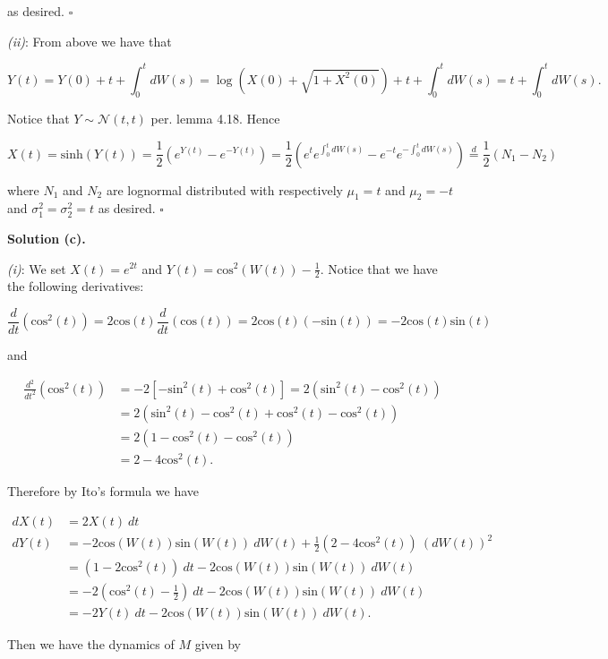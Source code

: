 \documentclass[
]{book}
\begin{document}
as desired. \(\square\)

\emph{(ii)}: From above we have that

\[
Y(t)=Y(0)+t+\int_0^tdW(s)=\log(X(0)+\sqrt{1+X^2(0)})+t+\int_0^tdW(s)=t+\int_0^t dW(s).
\]

Notice that \(Y\sim\mathcal{N}\left(t,t\right)\) per. lemma 4.18. Hence

\[
X(t)=\text{sinh}(Y(t))=\frac{1}{2}(e^{Y(t)}-e^{-Y(t)})=\frac{1}{2}(e^{t}e^{\int_0^t dW(s)}-e^{-t}e^{-\int_0^t dW(s)})\stackrel{d}{=}\frac{1}{2}(N_1-N_2)
\]

where \(N_1\) and \(N_2\) are lognormal distributed with respectively \(\mu_1=t\) and \(\mu_2=-t\) and \(\sigma^2_1=\sigma^2_2=t\) as desired. \(\square\)

\noindent\makebox[\linewidth]{\rule{\textwidth}{0.4pt}}

\textbf{Solution (c).}

\emph{(i)}: We set \(X(t)=e^{2t}\) and \(Y(t)=\text{cos}^2(W(t))-\frac{1}{2}\). Notice that we have the following derivatives:

\[
\frac{d}{dt}(\text{cos}^2(t))=2\text{cos}(t)\frac{d}{dt}(\text{cos}(t))=2\text{cos}(t)(-\text{sin}(t))=-2\text{cos}(t)\text{sin}(t)
\]

and

\begin{align*}
\frac{d^2}{dt^2}(\text{cos}^2(t))&=-2\left[-\text{sin}^2(t)+\text{cos}^2(t)\right]=2(\text{sin}^2(t)-\text{cos}^2(t))\\
&=2(\text{sin}^2(t)-\text{cos}^2(t)+\text{cos}^2(t)-\text{cos}^2(t))\\
&=2(1-\text{cos}^2(t)-\text{cos}^2(t))\\
&=2-4\text{cos}^2(t).
\end{align*}

Therefore by Ito's formula we have

\begin{align*}
dX(t)&=2X(t)\ dt\\
dY(t)&=-2\text{cos}(W(t))\text{sin}(W(t))\ dW(t)+\frac{1}{2}(2-4\text{cos}^2(t))\ (dW(t))^2\\
&=(1-2\text{cos}^2(t))\ dt-2\text{cos}(W(t))\text{sin}(W(t))\ dW(t)\\
&=-2\left(\text{cos}^2(t)-\frac{1}{2}\right)\ dt-2\text{cos}(W(t))\text{sin}(W(t))\ dW(t)\\
&=-2Y(t)\ dt-2\text{cos}(W(t))\text{sin}(W(t))\ dW(t).
\end{align*}

Then we have the dynamics of \(M\) given by
\end{document}
